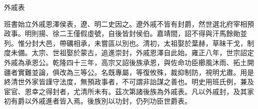 
\begin{pinyinscope}
外戚表

班書始立外戚恩澤侯表，遼、明二史因之。遼外戚不皆有封爵，然世選北府宰相預政事。明則揚、徐二王僅假虛號，自後皆封侯伯。嘉靖間，詔不得與汗馬餘勛並列。惟分封大邑，帶礪相承，未嘗區以別也。清初，太祖娶於葉赫，草昧干戈，制度未備。太宗、世祖娶於蒙古，追進崇封，外戚恩澤自此始。雍正八年，世宗詔定外戚為承恩公。乾隆四十三年，高宗又詔後族承恩，與佐命功臣櫛風沐雨、拓土開疆者實難並論，俱改為三等公。名既專屬，等復攸殊，裁抑制防，視明尤肅。用是終清世外家皆謹守法度，無預政事者，不可謂非詒謀之善也。明史用班氏例，兼及宦官、恩幸之得封者，尤清所未有。茲次第諸後族為外戚表。凡以外戚封，及其家初有爵以外戚進者皆入焉。後族別以功封，仍列功臣世爵表。


\end{pinyinscope}